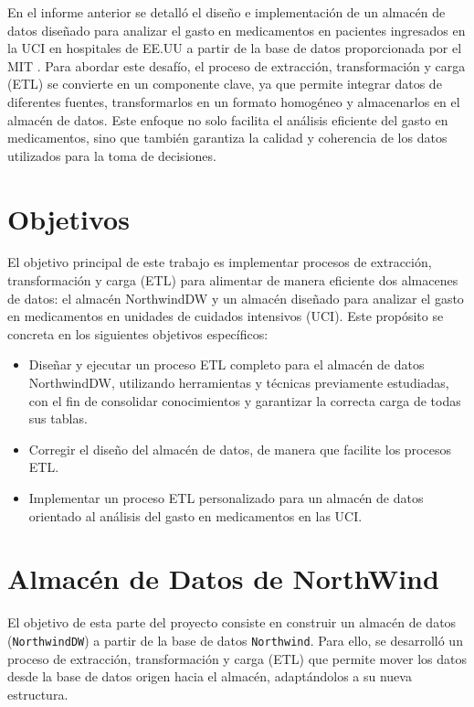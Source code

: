 \documentclass{article}
\begin{document}
	En el informe anterior se detalló el diseño e implementación de un almacén de datos diseñado para analizar el gasto en medicamentos en pacientes ingresados en la UCI en hospitales de EE.UU a partir de la base de datos proporcionada por el MIT \cite{eicu_crd}. Para abordar este desafío, el proceso de extracción, transformación y carga (ETL) se convierte en un componente clave, ya que permite integrar datos de diferentes fuentes, transformarlos en un formato homogéneo y almacenarlos en el almacén de datos. Este enfoque no solo facilita el análisis eficiente del gasto en medicamentos, sino que también garantiza la calidad y coherencia de los datos utilizados para la toma de decisiones.
	
	\section{Objetivos}
	\label{sec:objetivos}
	
	El objetivo principal de este trabajo es implementar procesos de extracción, transformación y carga (ETL) para alimentar de manera eficiente dos almacenes de datos: el almacén NorthwindDW y un almacén diseñado para analizar el gasto en medicamentos en unidades de cuidados intensivos (UCI). Este propósito se concreta en los siguientes objetivos específicos:
	
	\begin{itemize}
		\item Diseñar y ejecutar un proceso ETL completo para el almacén de datos NorthwindDW, utilizando herramientas y técnicas previamente estudiadas, con el fin de consolidar conocimientos y garantizar la correcta carga de todas sus tablas.
		\item Corregir el diseño del almacén de datos, de manera que facilite los procesos ETL.
		\item Implementar un proceso ETL personalizado para un almacén de datos orientado al análisis del gasto en medicamentos en las UCI.
		
	\end{itemize}
	
	\section{Almacén de Datos de NorthWind}
	
	El objetivo de esta parte del proyecto consiste en construir un almacén de datos (\texttt{NorthwindDW}) a partir de la base de datos \texttt{Northwind}. Para ello, se desarrolló un proceso de extracción, transformación y carga (ETL) que permite mover los datos desde la base de datos origen hacia el almacén, adaptándolos a su nueva estructura.
	
\end{document}
